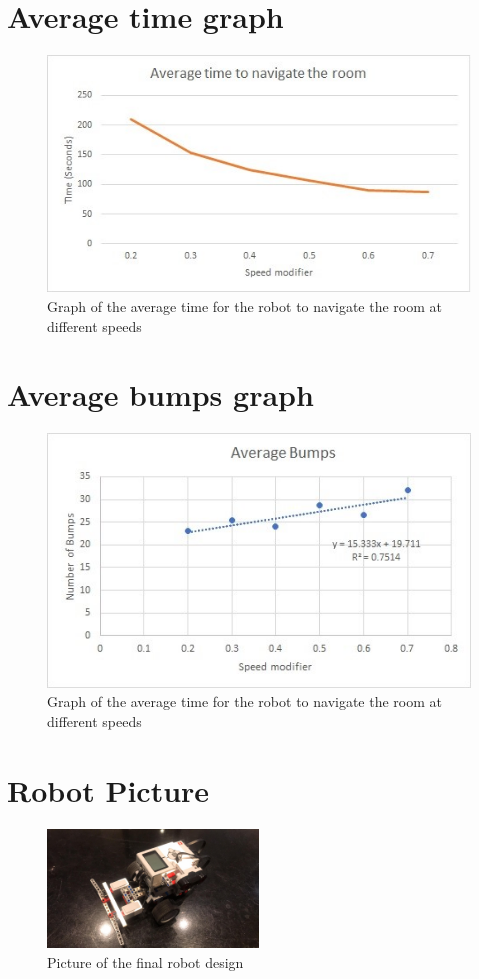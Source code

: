 \documentclass[12pt, letterpaper]{article}
\begin{document}
\begin{appendices}
\section{Average time graph}
\label{Time}
\begin{figure}[!h]
\centering
\includegraphics[width=\textwidth]{Timegraph}
\caption{Graph of the average time for the robot to navigate the room at different speeds}
\end{figure}
\newpage
\section{Average bumps graph}
\label{Bumps}
\begin{figure}[!h]
\centering
\includegraphics[width=\textwidth]{Bumpgraph}
\caption{Graph of the average time for the robot to navigate the room at different speeds}
\end{figure}

\section{Robot Picture}
\label{Robot}
\begin{figure}[!h]
\centering
\includegraphics[width=0.5\textwidth]{Robot}
\caption{Picture of the final robot design}
\end{figure}
\end{appendices}
\end{document}
